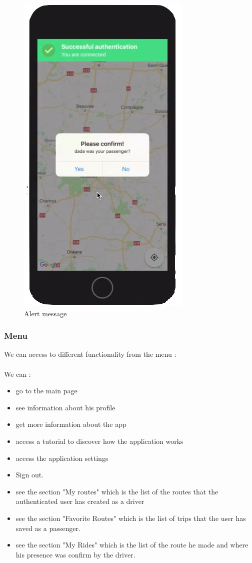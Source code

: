 \begin{figure}[h!]
\begin{center}
\includegraphics[scale = 0.3]{diagrams/AlertMessage.png} 
\end{center}
\caption{Alert message}
\end{figure}

\subsubsection{Menu}

We can access to different functionality from the menu :
\\\\
We can :
\begin{itemize}
\item go to the main page
\item see information about his profile
\item get more information about the app
\item access a tutorial to discover how the application works
\item access the application settings
\item Sign out.
\item see the section "My routes" which is the list of the routes that the authenticated user has created as a driver
\item see the section "Favorite Routes" which is the list of trips that the user has saved as a passenger.
\item see the section "My Rides" which is the list of the route he made and where his presence was confirm by the driver.
\end{itemize}

